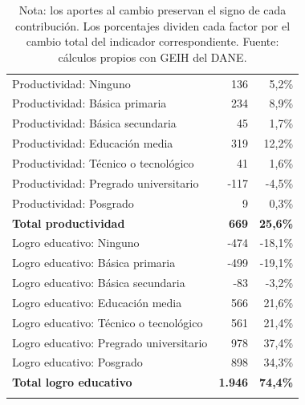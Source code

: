 \begin{table}[H]
\begin{tabular}{@{}p{6.4cm}rr@{}}
\midrule
Productividad: Ninguno & 136 & 5,2\% \\
Productividad: Básica primaria & 234 & 8,9\% \\
Productividad: Básica secundaria & 45 & 1,7\% \\
Productividad: Educación media & 319 & 12,2\% \\
Productividad: Técnico o tecnológico & 41 & 1,6\% \\
Productividad: Pregrado universitario & -117 & -4,5\% \\
Productividad: Posgrado & 9 & 0,3\% \\
\textbf{Total productividad} & \textbf{669} & \textbf{25,6\%} \\
\addlinespace[0.35em]
Logro educativo: Ninguno & -474 & -18,1\% \\
Logro educativo: Básica primaria & -499 & -19,1\% \\
Logro educativo: Básica secundaria & -83 & -3,2\% \\
Logro educativo: Educación media & 566 & 21,6\% \\
Logro educativo: Técnico o tecnológico & 561 & 21,4\% \\
Logro educativo: Pregrado universitario & 978 & 37,4\% \\
Logro educativo: Posgrado & 898 & 34,3\% \\
\textbf{Total logro educativo} & \textbf{1.946} & \textbf{74,4\%} \\
\addlinespace[0.35em]
\bottomrule
\end{tabular}
\caption*{\footnotesize Nota: los aportes al cambio preservan el signo de cada contribución. Los porcentajes dividen cada factor por el cambio total del indicador correspondiente. Fuente: cálculos propios con GEIH del DANE.}
\end{table}
